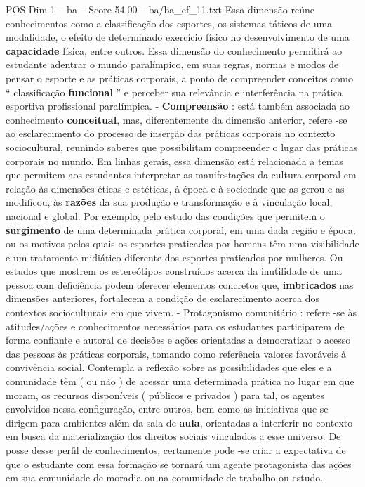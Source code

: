 \begin{textsample}{POS Dim 1 – ba – Score 54.00 – ba/ba\_ef\_11.txt}
Essa dimensão reúne conhecimentos como a classificação dos esportes, os sistemas táticos de uma modalidade, o efeito de determinado exercício físico no desenvolvimento de uma \textbf{capacidade} física, entre outros.
Essa dimensão do conhecimento permitirá ao estudante adentrar o mundo paralímpico, em suas regras, normas e modos de pensar o esporte e as práticas corporais, a ponto de compreender conceitos como “ classificação \textbf{funcional} ” e perceber sua relevância e interferência na prática esportiva profissional paralímpica. - \textbf{Compreensão} : está também associada ao conhecimento \textbf{conceitual}, mas, diferentemente da dimensão anterior, refere -se ao esclarecimento do processo de inserção das práticas corporais no contexto sociocultural, reunindo saberes que possibilitam compreender o lugar das práticas corporais no mundo.
Em linhas gerais, essa dimensão está relacionada a temas que permitem aos estudantes interpretar as manifestações da cultura corporal em relação às dimensões éticas e estéticas, à época e à sociedade que as gerou e as modificou, às \textbf{razões} da sua produção e transformação e à vinculação local, nacional e global.
Por exemplo, pelo estudo das condições que permitem o \textbf{surgimento} de uma determinada prática corporal, em uma dada região e época, ou os motivos pelos quais os esportes praticados por homens têm uma visibilidade e um tratamento midiático diferente dos esportes praticados por mulheres.
Ou estudos que mostrem os estereótipos construídos acerca da inutilidade de uma pessoa com deficiência podem oferecer elementos concretos que, \textbf{imbricados} nas dimensões anteriores, fortalecem a condição de esclarecimento acerca dos contextos socioculturais em que vivem. - Protagonismo comunitário : refere -se às atitudes/ações e conhecimentos necessários para os estudantes participarem de forma confiante e autoral de decisões e ações orientadas a democratizar o acesso das pessoas às práticas corporais, tomando como referência valores favoráveis à convivência social.
Contempla a reflexão sobre as possibilidades que eles e a comunidade têm ( ou não ) de acessar uma determinada prática no lugar em que moram, os recursos disponíveis ( públicos e privados ) para tal, os agentes envolvidos nessa configuração, entre outros, bem como as iniciativas que se dirigem para ambientes além da sala de \textbf{aula}, orientadas a interferir no contexto em busca da materialização dos direitos sociais vinculados a esse universo.
De posse desse perfil de conhecimentos, certamente pode -se criar a expectativa de que o estudante com essa formação se tornará um agente protagonista das ações em sua comunidade de moradia ou na comunidade de trabalho ou estudo.

\end{textsample}
